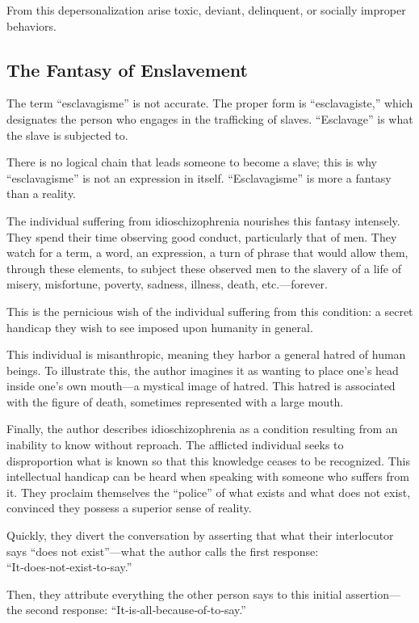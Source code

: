 \documentclass[12pt,oneside]{article}
\begin{document}
From this depersonalization arise toxic, deviant, delinquent, or socially improper behaviors.

\subsection{The Fantasy of Enslavement}

The term “esclavagisme” is not accurate. The proper form is “esclavagiste,” which designates the person who engages in the trafficking of slaves. “Esclavage” is what the slave is subjected to.

There is no logical chain that leads someone to become a slave; this is why “esclavagisme” is not an expression in itself. “Esclavagisme” is more a fantasy than a reality.

The individual suffering from idioschizophrenia nourishes this fantasy intensely. They spend their time observing good conduct, particularly that of men. They watch for a term, a word, an expression, a turn of phrase that would allow them, through these elements, to subject these observed men to the slavery of a life of misery, misfortune, poverty, sadness, illness, death, etc.—forever.

This is the pernicious wish of the individual suffering from this condition: a secret handicap they wish to see imposed upon humanity in general.

This individual is misanthropic, meaning they harbor a general hatred of human beings. To illustrate this, the author imagines it as wanting to place one’s head inside one’s own mouth—a mystical image of hatred. This hatred is associated with the figure of death, sometimes represented with a large mouth.

Finally, the author describes idioschizophrenia as a condition resulting from an inability to know without reproach. The afflicted individual seeks to disproportion what is known so that this knowledge ceases to be recognized. This intellectual handicap can be heard when speaking with someone who suffers from it. They proclaim themselves the “police” of what exists and what does not exist, convinced they possess a superior sense of reality.

Quickly, they divert the conversation by asserting that what their interlocutor says “does not exist”—what the author calls the first response: “It‑does‑not‑exist‑to‑say.”

Then, they attribute everything the other person says to this initial assertion—the second response: “It‑is‑all‑because‑of‑to‑say.”
\end{document}
